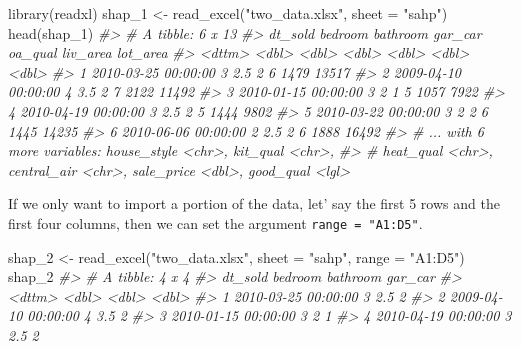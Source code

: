 \documentclass[
]{book}
\newenvironment{Shaded}{\begin{snugshade}}{\end{snugshade}}
\newcommand{\AttributeTok}[1]{\textcolor[rgb]{0.77,0.63,0.00}{#1}}
\newcommand{\CommentTok}[1]{\textcolor[rgb]{0.56,0.35,0.01}{\textit{#1}}}
\newcommand{\FunctionTok}[1]{\textcolor[rgb]{0.00,0.00,0.00}{#1}}
\newcommand{\NormalTok}[1]{#1}
\newcommand{\OtherTok}[1]{\textcolor[rgb]{0.56,0.35,0.01}{#1}}
\newcommand{\StringTok}[1]{\textcolor[rgb]{0.31,0.60,0.02}{#1}}
\begin{document}
\begin{Shaded}
\begin{Highlighting}[]
\FunctionTok{library}\NormalTok{(readxl)}
\NormalTok{shap\_1 }\OtherTok{\textless{}{-}} \FunctionTok{read\_excel}\NormalTok{(}\StringTok{"two\_data.xlsx"}\NormalTok{, }\AttributeTok{sheet =} \StringTok{"sahp"}\NormalTok{)}
\FunctionTok{head}\NormalTok{(shap\_1)}
\CommentTok{\#\textgreater{} \# A tibble: 6 x 13}
\CommentTok{\#\textgreater{}   dt\_sold             bedroom bathroom gar\_car oa\_qual liv\_area lot\_area}
\CommentTok{\#\textgreater{}   \textless{}dttm\textgreater{}                \textless{}dbl\textgreater{}    \textless{}dbl\textgreater{}   \textless{}dbl\textgreater{}   \textless{}dbl\textgreater{}    \textless{}dbl\textgreater{}    \textless{}dbl\textgreater{}}
\CommentTok{\#\textgreater{} 1 2010{-}03{-}25 00:00:00       3      2.5       2       6     1479    13517}
\CommentTok{\#\textgreater{} 2 2009{-}04{-}10 00:00:00       4      3.5       2       7     2122    11492}
\CommentTok{\#\textgreater{} 3 2010{-}01{-}15 00:00:00       3      2         1       5     1057     7922}
\CommentTok{\#\textgreater{} 4 2010{-}04{-}19 00:00:00       3      2.5       2       5     1444     9802}
\CommentTok{\#\textgreater{} 5 2010{-}03{-}22 00:00:00       3      2         2       6     1445    14235}
\CommentTok{\#\textgreater{} 6 2010{-}06{-}06 00:00:00       2      2.5       2       6     1888    16492}
\CommentTok{\#\textgreater{} \# ... with 6 more variables: house\_style \textless{}chr\textgreater{}, kit\_qual \textless{}chr\textgreater{},}
\CommentTok{\#\textgreater{} \#   heat\_qual \textless{}chr\textgreater{}, central\_air \textless{}chr\textgreater{}, sale\_price \textless{}dbl\textgreater{}, good\_qual \textless{}lgl\textgreater{}}
\end{Highlighting}
\end{Shaded}

If we only want to import a portion of the data, let' say the first 5 rows and the first four columns, then we can set the argument \texttt{range\ =\ "A1:D5"}.

\begin{Shaded}
\begin{Highlighting}[]
\NormalTok{shap\_2 }\OtherTok{\textless{}{-}} \FunctionTok{read\_excel}\NormalTok{(}\StringTok{"two\_data.xlsx"}\NormalTok{, }\AttributeTok{sheet =} \StringTok{"sahp"}\NormalTok{, }\AttributeTok{range =} \StringTok{"A1:D5"}\NormalTok{)}
\NormalTok{shap\_2}
\CommentTok{\#\textgreater{} \# A tibble: 4 x 4}
\CommentTok{\#\textgreater{}   dt\_sold             bedroom bathroom gar\_car}
\CommentTok{\#\textgreater{}   \textless{}dttm\textgreater{}                \textless{}dbl\textgreater{}    \textless{}dbl\textgreater{}   \textless{}dbl\textgreater{}}
\CommentTok{\#\textgreater{} 1 2010{-}03{-}25 00:00:00       3      2.5       2}
\CommentTok{\#\textgreater{} 2 2009{-}04{-}10 00:00:00       4      3.5       2}
\CommentTok{\#\textgreater{} 3 2010{-}01{-}15 00:00:00       3      2         1}
\CommentTok{\#\textgreater{} 4 2010{-}04{-}19 00:00:00       3      2.5       2}
\end{Highlighting}
\end{Shaded}
\end{document}
